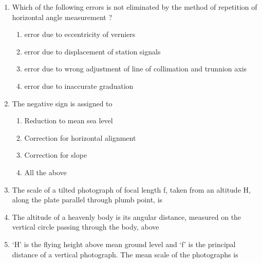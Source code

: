 \documentclass[11pt,a4paper]{article}
\begin{document}
\begin{enumerate}
\begin{enumerate}[label=\Alph*.]
\end{enumerate}
\item{Which of the following errors is not eliminated by the method of repetition of horizontal angle measurement ?}
\begin{enumerate}[label=\Alph*.]
\item{error due to eccentricity of verniers}
\item{error due to displacement of station signals}
\item{error due to wrong adjustment of line of collimation and trunnion axis}
\item{error due to inaccurate graduation}
\end{enumerate}
\item{The negative sign is assigned to}
\begin{enumerate}[label=\Alph*.]
\item{Reduction to mean sea level}
\item{Correction for horizontal alignment}
\item{Correction for slope}
\item{All the above}
\end{enumerate}
\item{The scale of a tilted photograph of focal length f, taken from an altitude H, along the plate parallel through plumb point, is}
\\
\item{The altitude of a heavenly body is its angular distance, measured on the vertical circle passing through the body, above}
\\
\item{`H' is the flying height above mean ground level and `f' is the principal distance of a vertical photograph. The mean scale of the photographs is
}
\end{enumerate}
\end{document}
